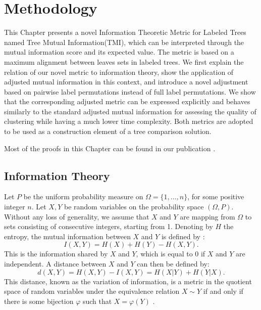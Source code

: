 \newtheorem{definition}{Definition}
\newtheorem{theorem}{Theorem}
\newtheorem{example}{Example}
\newtheorem{lemma}{Lemma}

\newtheorem{cor}{Corollary}
\newtheorem{prop}{Proposition}
\newtheorem{rem}{Remark}

\def\N{{\mathbb N}} 
\def\E{{\rm E}} 
\def\P{{\rm P}} 

\def\sign{{\rm sign}}

\def\sp{{\sigma_{\rm p}}}
\def\ia{\Delta I}
\def\ha{\Delta H}
\def\ip{\Delta_{\rm p}I}
\def\hp{\Delta_{\rm p} H}
\def\simp{s_{\rm p}}
\def\qp{q_{\rm p}}

\def\be{\begin{equation}}
\def\ee{\end{equation}}
\def\bp{\noindent {\it Proof.}\ }
\def\ep{\hfill $\Box$} 

\chapter{Methodology}
\label{design}

This Chapter presents a novel Information Theoretic Metric for Labeled Trees named Tree Mutual Information(TMI), which can be interpreted through the mutual information score and its expected value. The metric is based on a maximum alignment between leaves sets in labeled trees. We first explain the relation of our novel metric to information theory, show the application of adjusted mutual information in this context, and introduce a novel adjustment based on pairwise label permutations instead of full label permutations. We show that the corresponding adjusted metric can be expressed explicitly and behaves similarly to the standard adjusted mutual information for assessing the quality of clustering while having a much lower time complexity. Both metrics are adopted to be used as a construction element of a tree comparison solution.

Most of the proofs in this Chapter can be found in our publication \cite{Lazarenko2021pairwise}. 

\section{Information Theory}
Let $P$ be the uniform probability measure on  $\Omega = \{1,\ldots,n\}$, for some positive integer $n$. Let $X,Y$ be random variables on the probability space $(\Omega, P)$. Without any loss of generality, we assume that  $X$ and $Y$ are mapping from $\Omega$ to sets consisting of  consecutive integers, starting from 1.
Denoting by $H$ the entropy, the mutual information between $X$ and $Y$ is defined by \cite{cover}:
\be\label{eq:info}
I(X, Y) = H(X) + H(Y) - H(X,Y).
\ee
This is the information shared by $X$ and $Y$, which is equal to 0 if $X$ and $Y$ are independent.
A distance between $X$ and $Y$ can then be defined by:
$$%
d(X,Y) = H(X,Y) - I(X,Y) = H(X|Y) + H(Y| X).
$$%
This distance, known as the variation of information, is a metric in the quotient space of random variables under the equivalence relation $X\sim Y$ if and only if there is some bijection $\varphi$ such that $X = \varphi(Y)$ \cite{vi}.

